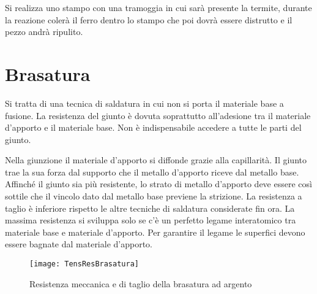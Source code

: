 Si realizza uno stampo con una tramoggia in cui sarà presente la termite, durante la reazione colerà il ferro dentro lo stampo che poi dovrà essere distrutto e il pezzo andrà ripulito.

\section{Brasatura}
Si tratta di una tecnica di saldatura in cui non si porta il materiale base a fusione. La resistenza del giunto è dovuta soprattutto all'adesione tra il materiale d'apporto e il materiale base.
Non è indispensabile accedere a tutte le parti del giunto.

Nella giunzione il materiale d'apporto si diffonde grazie alla capillarità.
Il giunto trae la sua forza dal supporto che il metallo d'apporto riceve dal metallo base.
Affinché il giunto sia più resistente, lo strato di metallo d'apporto deve essere così sottile che il vincolo dato dal metallo base previene la strizione.
La resistenza a taglio è inferiore rispetto le altre tecniche di saldatura considerate fin ora.
La massima resistenza si sviluppa solo se c'è un perfetto legame interatomico tra materiale base e materiale d'apporto.
Per garantire il legame le superfici devono essere bagnate dal materiale d'apporto.

\begin{figure}
\centering
\texttt{[image: TensResBrasatura]}
\caption{Resistenza meccanica e di taglio della brasatura ad argento}
\label{fig:TensResBrasatura}
\end{figure}


